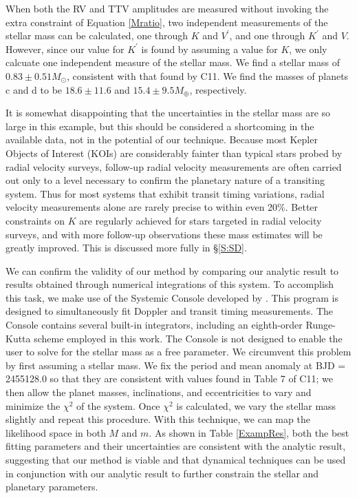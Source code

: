 When both the RV and TTV amplitudes are measured without invoking the extra constraint of Equation \ref{Mratio}, two independent measurements of the stellar mass can be calculated, one through $K$ and $V^\prime$, and one through $K^\prime$ and $V$. However, since our value for $K^\prime$ is found by assuming a value for $K$, we only calcuate one independent measure of the stellar mass. We find a stellar mass of $0.83 \pm 0.51 M_\odot$, consistent with that found by C11. We find the masses of planets c and d to be $18.6 \pm 11.6$ and $15.4 \pm 9.5 M_\oplus$, respectively.

It is somewhat disappointing that the uncertainties in the stellar mass are so large in this example, but this should be considered a shortcoming in the available data, not in the potential of our technique. Because most Kepler Objects of Interest (KOIs) are considerably fainter than typical stars probed by radial velocity surveys, follow-up radial velocity measurements are often carried out only to a level necessary to confirm the planetary nature of a transiting system. Thus for most systems that exhibit transit timing variations, radial velocity measurements alone are rarely precise to within even 20\%. Better constraints on $K$ are regularly achieved for stars targeted in radial velocity surveys, and with more follow-up observations these mass estimates will be greatly improved. This is discussed more fully in \S\ref{S:SD}.

We can confirm the validity of our method by comparing our analytic result to results obtained through numerical integrations of this system. To accomplish this task, we make use of the Systemic Console developed by \citet{Meschiari09}. This program is designed to simultaneously fit Doppler and transit timing measurements. The Console contains several built-in integrators, including an eighth-order Runge-Kutta scheme employed in this work. The Console is not designed to enable the user to solve for the stellar mass as a free parameter. We circumvent this problem by first assuming a stellar mass. We fix the period and mean anomaly at BJD = 2455128.0 so that they are consistent with values found in Table 7 of C11; we then allow the planet masses, inclinations, and eccentricities to vary and minimize the $\chi^2$ of the system. Once $\chi^2$ is calculated, we vary the stellar mass slightly and repeat this procedure. With this technique, we can map the likelihood space in both $M$ and $m$. As shown in Table \ref{ExampRes}, both the best fitting parameters and their uncertainties are consistent with the analytic result, suggesting that our method is viable and that dynamical techniques can be used in conjunction with our analytic result to further constrain the stellar and planetary parameters. 

